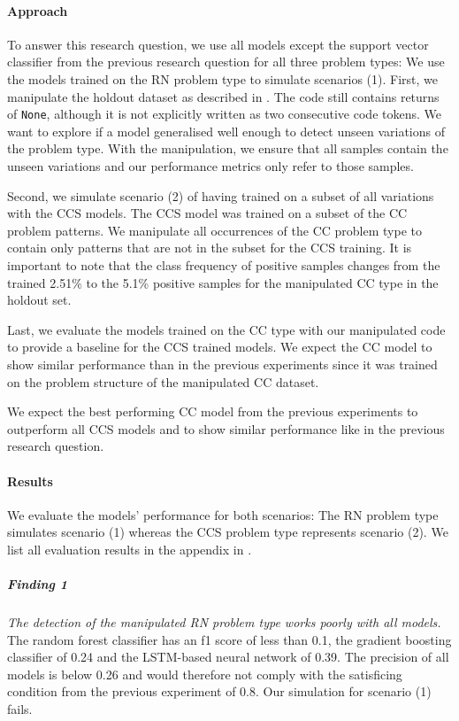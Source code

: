 \paragraph{Approach}
To answer this research question, we use all models except the support vector classifier from the previous research question for all three problem types: 
We use the models trained on the RN problem type to simulate scenarios (1). First, we manipulate the holdout dataset as described in . The code still contains returns of \texttt{None}, although it is not explicitly written as two consecutive code tokens. We want to explore if a model generalised well enough to detect unseen variations of the problem type. With the manipulation, we ensure that all samples contain the unseen variations and our performance metrics only refer to those samples. 

Second, we simulate scenario (2) of having trained on a subset of all variations with the CCS models. The CCS model was trained on a subset of the CC problem patterns. We manipulate all occurrences of the CC problem type to contain only patterns that are not in the subset for the CCS training. It is important to note that the class frequency of positive samples changes from the trained 2.51\% to the 5.1\% positive samples for the manipulated CC type in the holdout set.

Last, we evaluate the models trained on the CC type with our manipulated code to provide a baseline for the CCS trained models. We expect the CC model to show similar performance than in the previous experiments since it was trained on the problem structure of the manipulated CC dataset.

We expect the best performing CC model from the previous experiments to outperform all CCS models and to show similar performance like in the previous research question. 

\paragraph{Results}
We evaluate the models' performance for both scenarios: The RN problem type simulates scenario (1) whereas the CCS problem type represents scenario (2). We list all evaluation results in the appendix in .

\subparagraph{Finding 1}\label{finding:return_none_manipulated_bad}
\textit{The detection of the manipulated RN problem type works poorly with all models.} The random forest classifier has an f1 score of less than 0.1, the gradient boosting classifier of 0.24 and the LSTM-based neural network of 0.39. The precision of all models is below 0.26 and would therefore not comply with the satisficing condition from the previous experiment of 0.8. Our simulation for scenario (1) fails.

